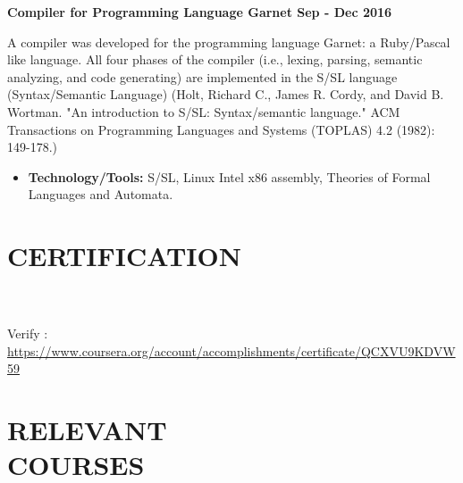 \documentclass[margin]{res}
\begin{document}
\begin{resume}
\textbf{Compiler for Programming Language Garnet \hfill Sep - Dec 2016}

A compiler was developed for the programming language Garnet: a Ruby/Pascal like language. All four phases of the compiler (i.e., lexing, parsing, semantic analyzing, and code generating) are implemented in the S/SL language (Syntax/Semantic Language) (Holt, Richard C., James R. Cordy, and David B. Wortman. "An introduction to S/SL: Syntax/semantic language." ACM Transactions on Programming Languages and Systems (TOPLAS) 4.2 (1982): 149-178.)
\begin{itemize}
\item \textbf{Technology/Tools:} S/SL, Linux Intel x86 assembly, Theories of Formal Languages and Automata.
\end{itemize}


\section{CERTIFICATION}
\par
{}
\\
 \\
Verify : \url{https://www.coursera.org/account/accomplishments/certificate/QCXVU9KDVW59}
\\


\section{RELEVANT\\COURSES}
\par


\end{resume}
\end{document}
